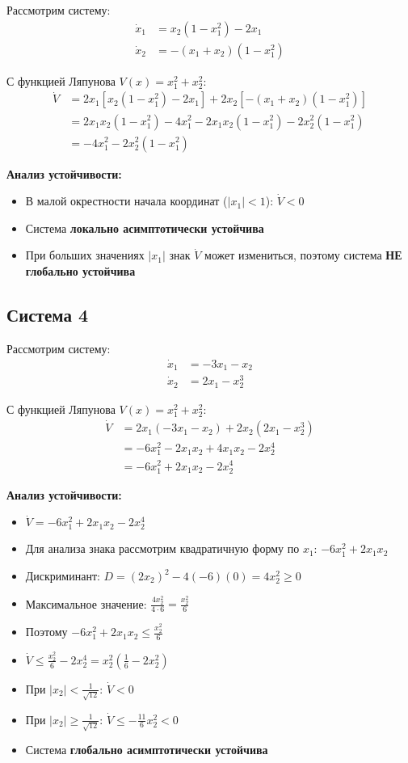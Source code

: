 Рассмотрим систему:
\begin{align}
\dot{x}_1 &= x_2(1 - x_1^2) - 2x_1 \\
\dot{x}_2 &= -(x_1 + x_2)(1 - x_1^2)
\end{align}

С функцией Ляпунова $V(x) = x_1^2 + x_2^2$:
\begin{align}
\dot{V} &= 2x_1[x_2(1 - x_1^2) - 2x_1] + 2x_2[-(x_1 + x_2)(1 - x_1^2)] \\
&= 2x_1 x_2(1 - x_1^2) - 4x_1^2 - 2x_1 x_2(1 - x_1^2) - 2x_2^2(1 - x_1^2) \\
&= -4x_1^2 - 2x_2^2(1 - x_1^2)
\end{align}

\textbf{Анализ устойчивости:}
\begin{itemize}
\item В малой окрестности начала координат ($|x_1| < 1$): $\dot{V} < 0$
\item Система \textbf{локально асимптотически устойчива}
\item При больших значениях $|x_1|$ знак $\dot{V}$ может измениться, поэтому система \textbf{НЕ глобально устойчива}
\end{itemize}

\subsection*{Система 4}

Рассмотрим систему:
\begin{align}
\dot{x}_1 &= -3x_1 - x_2 \\
\dot{x}_2 &= 2x_1 - x_2^3
\end{align}

С функцией Ляпунова $V(x) = x_1^2 + x_2^2$:
\begin{align}
\dot{V} &= 2x_1(-3x_1 - x_2) + 2x_2(2x_1 - x_2^3) \\
&= -6x_1^2 - 2x_1 x_2 + 4x_1 x_2 - 2x_2^4 \\
&= -6x_1^2 + 2x_1 x_2 - 2x_2^4
\end{align}

\textbf{Анализ устойчивости:}
\begin{itemize}
\item $\dot{V} = -6x_1^2 + 2x_1 x_2 - 2x_2^4$
\item Для анализа знака рассмотрим квадратичную форму по $x_1$: $-6x_1^2 + 2x_1 x_2$
\item Дискриминант: $D = (2x_2)^2 - 4(-6)(0) = 4x_2^2 \geq 0$
\item Максимальное значение: $\frac{4x_2^2}{4 \cdot 6} = \frac{x_2^2}{6}$
\item Поэтому $-6x_1^2 + 2x_1 x_2 \leq \frac{x_2^2}{6}$
\item $\dot{V} \leq \frac{x_2^2}{6} - 2x_2^4 = x_2^2(\frac{1}{6} - 2x_2^2)$
\item При $|x_2| < \frac{1}{\sqrt{12}}$: $\dot{V} < 0$
\item При $|x_2| \geq \frac{1}{\sqrt{12}}$: $\dot{V} \leq -\frac{11}{6}x_2^2 < 0$
\item Система \textbf{глобально асимптотически устойчива}
\end{itemize}

